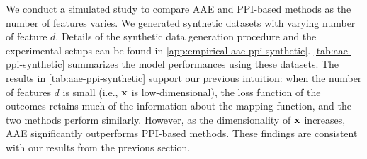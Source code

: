 

We conduct a simulated study to compare AAE and PPI-based methods as the number of features varies. We generated synthetic datasets with varying number of feature $d$. Details of the synthetic data generation procedure and the experimental setups can be found in \cref{app:empirical-aae-ppi-synthetic}. \cref{tab:aae-ppi-synthetic} summarizes the model performances using these datasets. The results in \cref{tab:aae-ppi-synthetic} support our previous intuition: when the number of features $d$ is small (i.e., $\mathbf{x}$ is low-dimensional), the loss function of the outcomes retains much of the information about the mapping function, and the two methods perform similarly. However, as the dimensionality of $\mathbf{x}$ increases, AAE significantly outperforms PPI-based methods. These findings are consistent with our results from the previous section.


